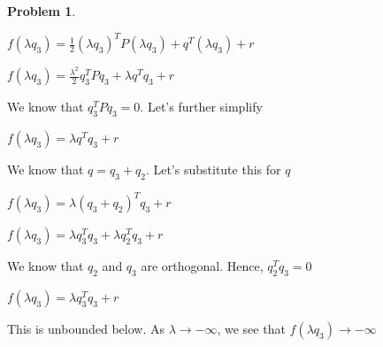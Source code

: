 \documentclass{article}
\theoremstyle{definition}
\newtheorem{problem}{Problem}
\begin{document}
\begin{problem}
\begin{enumerate}
    $f(\lambda q_3) = \frac{1}{2} (\lambda q_3)^TP(\lambda q_3) + q^T(\lambda q_3) + r$ \newline 

    $f(\lambda q_3) = \frac{\lambda^2}{2} q_3^TPq_3 + \lambda q^Tq_3 + r$ \newline

    We know that $q_3^TPq_3 = 0$. Let's further simplify \newline 

    $f(\lambda q_3) = \lambda q^Tq_3 + r$ \newline

    We know that $q = q_3 + q_2$. Let's substitute this for $q$ \newline 


    $f(\lambda q_3) = \lambda (q_3 + q_2)^Tq_3 + r$ \newline

    $f(\lambda q_3) = \lambda q_3^Tq_3 + \lambda q_2^Tq_3 + r$ \newline

    We know that $q_2$ and $q_3$ are orthogonal. Hence, $q_2^Tq_3 = 0$ \newline 

    $f(\lambda q_3) = \lambda q_3^Tq_3  + r$ \newline

    This is unbounded below. As $\lambda \rightarrow -\infty$, we see that $f(\lambda q_3) \rightarrow -\infty$
    
\end{enumerate}

\end{problem}
\end{document}
